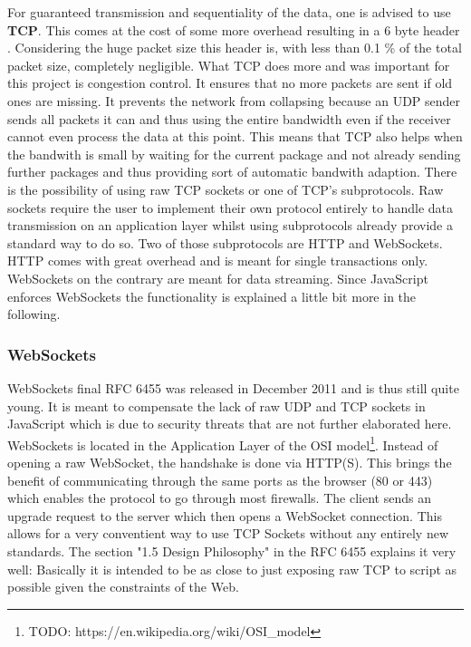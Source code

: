 For guaranteed transmission and sequentiality of the data, one is advised to use \textbf{TCP}. This comes at the cost of some more overhead resulting in a 6 byte header \cite{TODO: refrence}. Considering the huge packet size this header is, with less than 0.1 \% of the total packet size, completely negligible. What TCP does more and was important for this project is congestion control. It ensures that no more packets are sent if old ones are missing. It prevents the network from collapsing because an UDP sender sends all packets it can and thus using the entire bandwidth even if the receiver cannot even process the data at this point.
This means that TCP also helps when the bandwith is small by waiting for the current package and not already sending further packages and thus providing sort of automatic bandwith adaption.
There is the possibility of using raw TCP sockets or one of TCP's subprotocols. Raw sockets require the user to implement their own protocol entirely to handle data transmission on an application layer whilst using subprotocols already provide a standard way to do so.
Two of those subprotocols are HTTP and WebSockets. HTTP comes with great overhead and is meant for single transactions only.
WebSockets on the contrary are meant for data streaming.
Since JavaScript enforces WebSockets the functionality is explained a little bit more in the following.

\subsubsection{WebSockets}

WebSockets final RFC 6455\cite{TODO: https://tools.ietf.org/html/rfc6455,} was released in December 2011 and is thus still quite young. It is meant to compensate the lack of raw UDP and TCP sockets in JavaScript which is due to security threats that are not further elaborated here.
WebSockets is located in the Application Layer of the OSI model\footnote{TODO: https://en.wikipedia.org/wiki/OSI\_model}.
Instead of opening a raw WebSocket, the handshake is done via HTTP(S). This brings the benefit of communicating through the same ports as the browser (80 or 443) which enables the protocol to go through most firewalls.
The client sends an upgrade request to the server which then opens a WebSocket connection.
This allows for a very conventient way to use TCP Sockets without any entirely new standards.
The section "1.5 Design Philosophy" in the RFC 6455\cite{TODO: https://tools.ietf.org/html/rfc6455,} explains it very well:
Basically it is intended to be as close to just exposing raw TCP to script as possible given the constraints of the Web.

